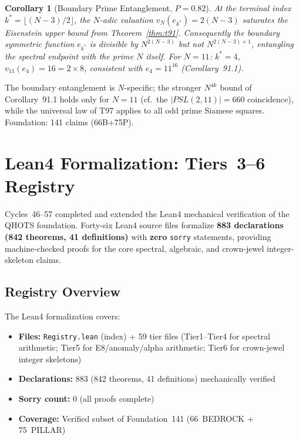 \documentclass[aps,prd,twocolumn,superscriptaddress,floatfix,nofootinbib]{revtex4-2}
\newtheorem{corollary}[theorem]{Corollary}
\theoremstyle{definition}
\theoremstyle{remark}
\begin{document}
\begin{corollary}[Boundary Prime Entanglement, $P{=}0.82$]
\label{cor:t97-boundary}
At the terminal index $k^* = \lfloor(N-3)/2\rfloor$, the $N$-adic valuation
$v_N(e_{k^*}) = 2(N-3)$ saturates the Eisenstein upper bound from
Theorem~\ref{thm:t91}.  Consequently the boundary symmetric function
$e_{k^*}$ is divisible by $N^{2(N-3)}$ but not $N^{2(N-3)+1}$, entangling
the spectral endpoint with the prime $N$ itself.  For $N=11$:
$k^*=4$, $v_{11}(e_4)=16=2\times 8$, consistent with $e_4=11^{16}$
(Corollary~91.1).
\end{corollary}

The boundary entanglement is $N$-specific; the stronger $N^{4k}$ bound of
Corollary~91.1 holds only for $N=11$ (cf.\ the $|PSL(2,11)|=660$ coincidence),
while the universal law of T97 applies to all odd prime Siamese squares.
Foundation: 141 claims (66B+75P).


\section{Lean4 Formalization: Tiers~3--6 Registry}
\label{sec:lean4-tier3}

Cycles~46--57 completed and extended the Lean4 mechanical verification
of the QHOTS foundation.  Forty-six Lean4 source files formalize
\textbf{883 declarations (842 theorems, 41 definitions)} with \textbf{zero} \texttt{sorry} statements,
providing machine-checked proofs for the core spectral, algebraic,
and crown-jewel integer-skeleton claims.

\subsection{Registry Overview}

The Lean4 formalization covers:
\begin{itemize}
  \item \textbf{Files:} \texttt{Registry.lean} (index) + 59 tier files
        (Tier1--Tier4 for spectral arithmetic; Tier5 for E8/anomaly/alpha
        arithmetic; Tier6 for crown-jewel integer skeletons)
  \item \textbf{Declarations:} 883 (842 theorems, 41 definitions) mechanically verified
  \item \textbf{Sorry count:} 0 (all proofs complete)
  \item \textbf{Coverage:} Verified subset of Foundation~141
        (66~BEDROCK + 75~PILLAR)
\end{itemize}
\end{document}
